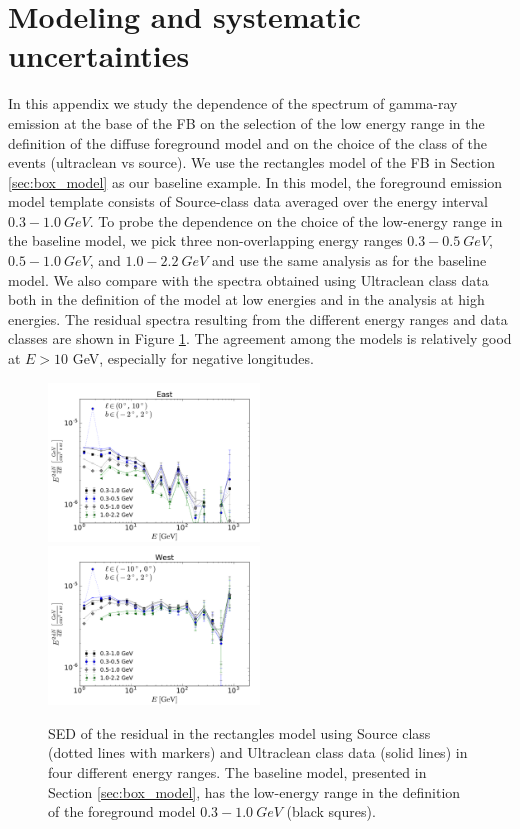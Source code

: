 \section{Modeling and systematic uncertainties}

In this appendix we study the dependence of the spectrum of gamma-ray emission at the base of the FB
on the selection of the low energy range in the definition of the diffuse foreground model
and on the choice of the class of the events (ultraclean vs source).
We use the rectangles model of the FB in Section \ref{sec:box_model}
as our baseline example.
In this model, the foreground emission model template consists of Source-class data averaged over the energy interval $0.3 - \SI{1.0}{GeV}$. 
To probe the dependence on the choice of the low-energy range in the baseline model, 
we pick three non-overlapping energy ranges $0.3 - \SI{0.5}{GeV}$, $0.5 - \SI{1.0}{GeV}$, and $1.0 - \SI{2.2}{GeV}$ 
and use the same analysis as for the baseline model. 
We also compare with the spectra obtained using Ultraclean class data both in the definition of the model
at low energies and in the analysis at high energies.
The residual spectra resulting from the different energy ranges and data classes are shown in Figure \ref{fig:syst_models}. 
The agreement among the models is relatively good at $E > 10$ GeV, especially for negative longitudes.

\begin{figure}[h]
\includegraphics[width=0.5\textwidth]{plots/SED_different_lowE_ranges_boxes_l=5_b=0.pdf}
\includegraphics[width=0.5\textwidth]{plots/SED_different_lowE_ranges_boxes_l=-5_b=0.pdf}
\caption{SED of the residual in the rectangles model using Source class (dotted lines with markers) and Ultraclean class data (solid lines) in four different energy ranges. The baseline model, presented in Section \ref{sec:box_model}, has the low-energy range in the definition of the foreground model
$0.3 - \SI{1.0}{GeV}$ (black squres).}
\label{fig:syst_models}
\end{figure}

